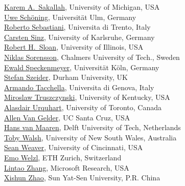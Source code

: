 \documentclass[10pt]{article}
\begin{document}
\begin{minipage}[t]{7.5cm}
{          \href{http://www.eecs.umich.edu/~karem/}{Karem A.\ Sakallah}, University of Michigan, USA  \\
          \href{http://theorie.informatik.uni-ulm.de/Personen/Schoening/index.html}{Uwe Sch\"oning}, Universit\"at Ulm, Germany   \\
          \href{http://www.dit.unitn.it/~rseba/}{Roberto Sebastiani}, Universita di Trento, Italy  \\
          \href{http://www.carstensinz.de/}{Carsten Sinz}, University of Karlsruhe, Germany \\
          \href{http://www.cs.uic.edu/~sloan/}{Robert H.\ Sloan}, University of Illinois, USA  \\
          \href{http://www.cs.chalmers.se/~nik/}{Niklas Sorensson}, Chalmers University of Tech., Sweden  \\
          \href{http://www.scale.uni-koeln.de/}{Ewald Speckenmeyer}, Universit\"at K\"oln, Germany  \\
          \href{http://www.dur.ac.uk/stefan.szeider/}{Stefan Szeider}, Durham University, UK  \\
          \href{http://www.mrg.dist.unige.it/~tac/}{Armando Tacchella}, Universita di Genova, Italy  \\
          \href{http://www.cs.uky.edu/~mirek/}{Miroslaw Truszczynski}, University of Kentucky, USA  \\
          \href{http://www.philosophy.utoronto.ca/people/~aurquhart}{Alasdair Urquhart}, University of Toronto, Canada\\
          \href{http://www.soe.ucsc.edu/~avg/}{Allen Van Gelder}, UC Santa Cruz, USA  \\
          \href{http://www.st.ewi.tudelft.nl/~maaren/}{Hans van Maaren},  Delft University of Tech, Netherlands  \\
          \href{http://www.cse.unsw.edu.au/~tw/}{Toby Walsh}, University of New South Wales, Australia  \\
          \href{http://www.cs.uc.edu/~weaversa/}{Sean Weaver}, University of Cincinnati, USA  \\
          \href{http://www.inf.ethz.ch/personal/emo/}{Emo Welzl}, ETH Zurich, Switzerland  \\
          \href{http://research.microsoft.com/users/lintaoz/}{Lintao Zhang}, Microsoft Research, USA  \\
          \href{http://logic.sysu.edu.cn/2005/english/PEOPLE/200510/english_277.html}{Xishun Zhao}, Sun Yat-Sen University, P.R. China  \\
}
\end{minipage}
\end{document}
